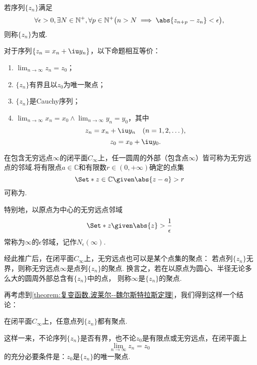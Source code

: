 \begin{definition}
若序列\(\{z_n\}\)满足\[
\forall \epsilon > 0, \exists N \in \mathbb{N}^+, \forall p\in\mathbb{N}^+ \bigl(
n > N  \implies  \abs{z_{n+p} - z_n} < \epsilon
\bigr),
\]则称\(\{z_n\}\)为或.
\end{definition}

\begin{theorem}
对于序列\(\{z_n = x_n + \iu y_n\}\)，以下命题相互等价：
\begin{enumerate}
\item \(\lim_{n\to\infty} z_n = z_0\)；

\item \(\{z_n\}\)有界且以\(z_0\)为唯一聚点；

\item \(\{z_n\}\)是Cauchy序列；

\item \(\lim_{n\to\infty} x_n = x_0 \land \lim_{n\to\infty} y_n = y_0\)，其中\[
z_n = x_n + \iu y_n \quad(n = 1,2,\dotsc),
\]\[
z_0 = x_0 + \iu y_0.
\]
\end{enumerate}
\end{theorem}

\begin{definition}
在包含无穷远点\(\infty\)的闭平面\(C_\infty\)上，任一圆周的外部（包含点\(\infty\)）皆可称为无穷远点的邻域.将有限点\(a\in\mathbb{C}\)和有限数\(r\in(0,+\infty)\)确定的点集\[
\Set*{ z\in\mathbb{C} \given \abs{z-a}>r }
\]可称为.

特别地，以原点为中心的无穷远点邻域\[
\Set*{ z \given \abs{z} > \frac{1}{\epsilon} }
\]常称为\(\infty\)的\(\epsilon\)邻域，记作\(N_{\epsilon}(\infty)\).
\end{definition}
经此推广后，在闭平面\(C_\infty\)上，无穷远点也可以是某个点集的聚点：
若点列\(\{z_n\}\)无界，则称无穷远点\(\infty\)是点列\(\{z_n\}\)的聚点.
换言之，若在以原点为圆心、半径无论多么大的圆周外部总含有\(\{z_n\}\)中的点，
则称\(\infty\)是\(\{z_n\}\)的聚点.

再考虑到\cref{theorem:复变函数.波莱尔--魏尔斯特拉斯定理}，我们得到这样一个结论：
\begin{theorem}
在闭平面\(C_\infty\)上，任意点列\(\{z_n\}\)都有聚点.
\end{theorem}
这样一来，不论序列\(\{z_n\}\)是否有界，也不论\(z_0\)是有限点或无穷远点，在闭平面上\[
\lim_{n\to\infty} z_n = z_0
\]的充分必要条件是：\(z_0\)是\(\{z_n\}\)的唯一聚点.

